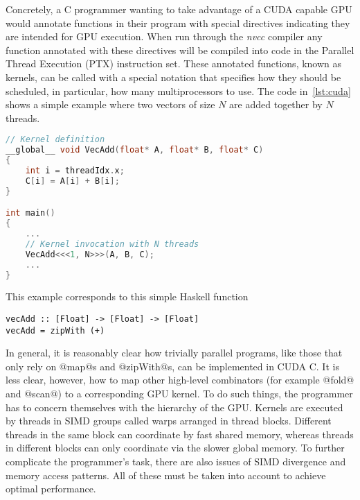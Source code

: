 Concretely, a C programmer wanting to take advantage of a CUDA capable GPU would annotate functions in their program with special directives indicating they are intended for GPU execution. When run through the \emph{nvcc} compiler any function annotated with these directives will be compiled into code in the Parallel Thread Execution (PTX) instruction set. These annotated functions, known as kernels, can be called with a special notation that specifies how they should be scheduled, in particular, how many multiprocessors to use. The code in~\ref{lst:cuda} shows a simple example where two vectors of size $N$ are added together by $N$ threads.
%
\begin{lstlisting}[language=C, label=lst:cuda, caption={Adding two $N$ length vectors in CUDA C\citep{cuda}}]
// Kernel definition
__global__ void VecAdd(float* A, float* B, float* C)
{
    int i = threadIdx.x;
    C[i] = A[i] + B[i];
}

int main()
{
    ...
    // Kernel invocation with N threads
    VecAdd<<<1, N>>>(A, B, C);
    ...
}
\end{lstlisting}
%
This example corresponds to this simple Haskell function
%
\begin{lstlisting}
vecAdd :: [Float] -> [Float] -> [Float]
vecAdd = zipWith (+)
\end{lstlisting}

In general, it is reasonably clear how trivially parallel programs, like those that only rely on @map@s and @zipWith@s, can be implemented in CUDA C. It is less clear, however, how to map other high-level combinators (for example @fold@ and @scan@) to a corresponding GPU kernel. To do such things, the programmer has to concern themselves with the hierarchy of the GPU. Kernels are executed by threads in SIMD groups called warps arranged in thread blocks. Different threads in the same block can coordinate by fast shared memory, whereas threads in different blocks can only coordinate via the slower global memory. To further complicate the programmer's task, there are also issues of SIMD divergence and memory access patterns. All of these must be taken into account to achieve optimal performance.


